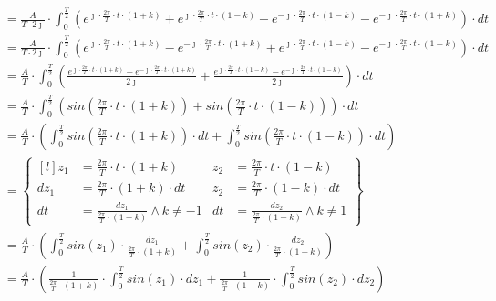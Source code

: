 \begin{task}
\begin{align*}
&=\frac{A}{T\cdot 2\jmath} \cdot \int_{0}^{\frac{T}{2}}
\left(e^{\jmath \cdot \frac{2\pi}{T} \cdot t \cdot \left(1+k\right)} + e^{\jmath \cdot \frac{2\pi}{T} \cdot t \cdot \left(1 - k\right)} - e^{-\jmath \cdot \frac{2\pi}{T} \cdot t \cdot \left(1 -k\right)} - e^{-\jmath \cdot \frac{2\pi}{T} \cdot t \cdot \left(1+k\right)} \right) \cdot dt\\
&=\frac{A}{T\cdot 2\jmath} \cdot \int_{0}^{\frac{T}{2}}
\left(e^{\jmath \cdot \frac{2\pi}{T} \cdot t \cdot \left(1+k\right)} - e^{-\jmath \cdot \frac{2\pi}{T} \cdot t \cdot \left(1+k\right)} + e^{\jmath \cdot \frac{2\pi}{T} \cdot t \cdot \left(1 - k\right)} - e^{-\jmath \cdot \frac{2\pi}{T} \cdot t \cdot \left(1 -k\right)} \right) \cdot dt\\
&=\frac{A}{T} \cdot \int_{0}^{\frac{T}{2}}
\left( \frac{e^{\jmath \cdot \frac{2\pi}{T} \cdot t \cdot \left(1+k\right)} - e^{-\jmath \cdot \frac{2\pi}{T} \cdot t \cdot \left(1+k\right)}}{2\jmath} + \frac{e^{\jmath \cdot \frac{2\pi}{T} \cdot t \cdot \left(1 - k\right)} - e^{-\jmath \cdot \frac{2\pi}{T} \cdot t \cdot \left(1 -k\right)}}{2\jmath} \right) \cdot dt\\
&=\frac{A}{T} \cdot \int_{0}^{\frac{T}{2}}
\left( sin\left( \frac{2\pi}{T} \cdot t \cdot \left(1+k\right) \right) + sin\left( \frac{2\pi}{T} \cdot t \cdot \left(1 - k\right)\right) \right) \cdot dt\\
&=\frac{A}{T} \cdot \left( \int_{0}^{\frac{T}{2}}
 sin\left( \frac{2\pi}{T} \cdot t \cdot \left(1+k\right) \right) \cdot dt + \int_{0}^{\frac{T}{2}} sin\left( \frac{2\pi}{T} \cdot t \cdot \left(1 - k\right)\right) \cdot dt \right)\\
&=\begin{Bmatrix*}[l]
z_1&=\frac{2\pi}{T} \cdot t \cdot \left(1+k\right) & z_2&=\frac{2\pi}{T} \cdot t \cdot \left(1-k\right)\\
dz_1&=\frac{2\pi}{T} \cdot \left(1+k\right) \cdot dt & z_2&=\frac{2\pi}{T} \cdot \left(1-k\right) \cdot dt\\
dt&=\frac{dz_1}{\frac{2\pi}{T} \cdot \left(1+k\right)} \wedge k \neq -1& dt&=\frac{dz_2}{\frac{2\pi}{T} \cdot \left(1-k\right)} \wedge k \neq 1
\end{Bmatrix*}\\
&=\frac{A}{T} \cdot \left(\int_{0}^{\frac{T}{2}} sin\left( z_1 \right)\cdot \frac{dz_1}{\frac{2\pi}{T} \cdot \left(1+k\right)}  + \int_{0}^{\frac{T}{2}} sin\left( z_2\right) \cdot \frac{dz_2}{\frac{2\pi}{T} \cdot \left(1-k\right)}\right)\\
&=\frac{A}{T} \cdot \left(\frac{1}{\frac{2\pi}{T}\cdot \left(1+k\right)} \cdot \int_{0}^{\frac{T}{2}} sin\left( z_1 \right)\cdot dz_1 + \frac{1}{\frac{2\pi}{T} \cdot \left(1-k\right)} \cdot \int_{0}^{\frac{T}{2}} sin\left( z_2\right) \cdot dz_2 \right)\\

\end{align*}
\end{task}
